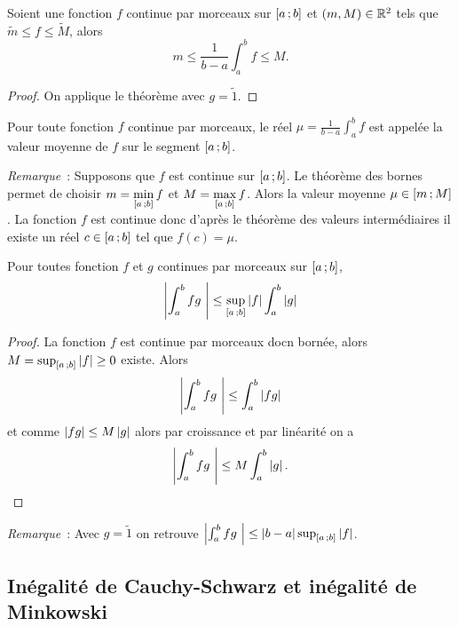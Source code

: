 \begin{corth}
  Soient une fonction $f$  continue par morceaux sur $\left[ a \, ;  b \right]$ et $(m,M)\in \mathbb{R}^2$ tels que $\tilde{m} \leq f \leq \tilde{M}$, alors
  \begin{equation}
    m \leq \frac{1}{b-a} \int_a^b f \leq M.
  \end{equation}
\end{corth}
\begin{proof}
  On applique le théorème avec $g=\tilde{1}$.
\end{proof}

\begin{defdef}
  Pour toute fonction $f$ continue par morceaux, le réel $\mu = \frac{1}{b-a} \int_a^b f$ est appelée la valeur moyenne de $f$ sur le segment $\left[ a \, ;  b \right]$.
\end{defdef}

\emph{Remarque}~: Supposons que $f$ est continue sur $\left[ a \, ;  b \right]$. Le théorème des bornes permet de choisir $m = \min\limits_{\left[ a \, ;  b \right]} f$ et $M = \max\limits_{\left[ a \, ;  b \right]} f$. Alors la valeur moyenne $\mu \in \left[ m \, ;  M \right]$. La fonction $f$ est continue donc d'après le théorème des valeurs intermédiaires il existe un réel $c \in \left[ a \, ;  b \right]$ tel que $f(c)=\mu$.

\begin{theo}
  Pour toutes fonction $f$ et $g$ continues par morceaux sur $\left[ a \, ;  b \right]$,
  \begin{equation}
    \left\lvert\int_a^b fg~\right\rvert \leq \sup_{\left[ a \, ;  b \right]} \left\lvert f\right\rvert \int_a^b \left\lvert g\right\rvert
  \end{equation}
\end{theo}
\begin{proof}
  La fonction $f$ est continue par morceaux docn bornée, alors $M = \sup_{\left[ a \, ;  b \right]} \left\lvert f\right\rvert \geq 0$ existe. Alors
  \begin{equation}
    \left\lvert\int_a^b fg~\right\rvert \leq \int_a^b \left\lvert fg\right\rvert
  \end{equation}
  et comme $\left\lvert fg\right\rvert \leq M\left\lvert g\right\rvert$ alors par croissance et par linéarité on a
  \begin{equation}
    \left\lvert\int_a^b fg~\right\rvert \leq M \int_a^b \left\lvert g\right\rvert.
  \end{equation}
\end{proof}

\emph{Remarque}~: Avec $g=\tilde{1}$ on retrouve $\left\lvert\int_a^b fg~\right\rvert \leq \left\lvert b-a\right\rvert \sup_{\left[ a \, ;  b \right]} \left\lvert f\right\rvert$.

\subsection{Inégalité de Cauchy-Schwarz et inégalité de Minkowski}

